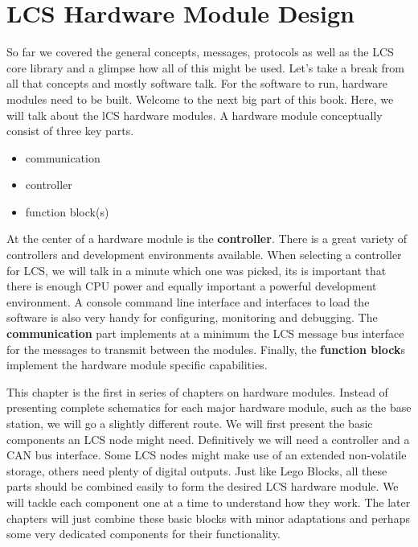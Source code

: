 \chapter{LCS Hardware Module Design}

So far we covered the general concepts, messages, protocols as well as the LCS core library and a glimpse how all of this might be used. Let's take a break from all that concepts and mostly software talk. For the software to run, hardware modules need to be built. Welcome to the next big part of this book. Here, we will talk about the lCS hardware modules. A hardware module conceptually consist of three key parts.
\begin{itemize}
\item communication
\item controller
\item function block(s)
\end{itemize}

At the center of a hardware module is the \textbf{controller}. There is a great variety of controllers and development environments available. When selecting a controller for LCS, we will talk in a minute which one was picked, its is important that there is enough CPU power and equally important a powerful development environment. A console command line interface and interfaces to load the software is also very handy for configuring, monitoring and debugging. The \textbf{communication} part implements at a minimum the LCS message bus interface for the messages to transmit between the modules. Finally, the \textbf{function block}s implement the hardware module specific capabilities.

 This chapter is the first in series of chapters on hardware modules. Instead of presenting complete schematics for each major hardware module, such as the base station, we will go a slightly different route. We will first present the basic components an LCS node might need. Definitively we will need a controller and a CAN bus interface. Some LCS nodes might make use of an extended non-volatile storage, others need plenty of digital outputs. Just like Lego Blocks, all these parts should be combined easily to form the desired LCS hardware module. We will tackle each component one at a time to understand how they work. The later chapters will just combine these basic blocks with minor adaptations and perhaps some very dedicated components for their functionality.

